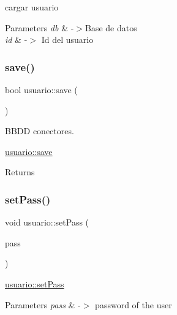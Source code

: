 cargar usuario 


\begin{DoxyParams}{Parameters}
{\em db} & -\/$>$Base de datos \\
\hline
{\em id} & -\/$>$ Id del usuario \\
\hline
\end{DoxyParams}
\mbox{\label{classusuario_af8164ee3562617e639d4ff25ba3b4aa1}} 
\subsubsection{\texorpdfstring{save()}{save()}}
{\footnotesize\ttfamily bool usuario\+::save (\begin{DoxyParamCaption}{ }\end{DoxyParamCaption})}



B\+B\+DD conectores. 

\mbox{\hyperlink{classusuario_af8164ee3562617e639d4ff25ba3b4aa1}{usuario\+::save}}

\begin{DoxyReturn}{Returns}

\end{DoxyReturn}
\mbox{\label{classusuario_a0837dba1e902a3853cdc26dfc8a1d7ec}} 
\subsubsection{\texorpdfstring{set\+Pass()}{setPass()}}
{\footnotesize\ttfamily void usuario\+::set\+Pass (\begin{DoxyParamCaption}\item[{Q\+String}]{pass }\end{DoxyParamCaption})}



\mbox{\hyperlink{classusuario_a0837dba1e902a3853cdc26dfc8a1d7ec}{usuario\+::set\+Pass}} 


\begin{DoxyParams}{Parameters}
{\em pass} & -\/$>$ password of the user \\
\hline
\end{DoxyParams}
\mbox{\label{classusuario_adea7be5d8eb2f89a54c38d9a0a7cf847}} 
